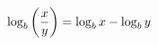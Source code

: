 \documentclass[preview]{standalone}
\begin{document}
\begin{align*}
\special{dvisvgm:raw <g id='unique000'>}\log_b \left( \frac{x}{y} \right) = \log_b x - \log_b y\special{dvisvgm:raw </g>}
\end{align*}
\end{document}
